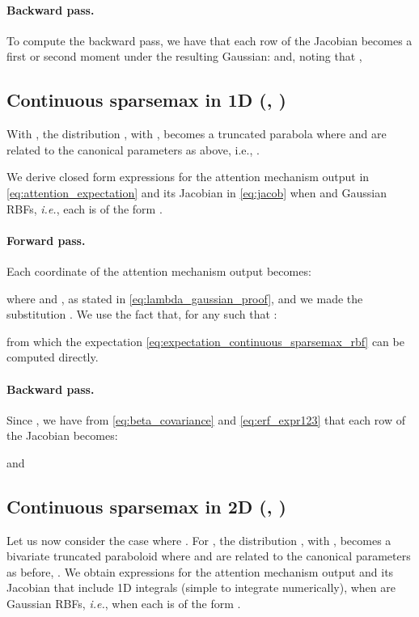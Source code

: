 \documentclass{article}
\begin{document}
\paragraph{Backward pass.}
To compute the backward pass, we have that each row of the Jacobian  becomes a first or second moment under the resulting Gaussian:
 and, noting that ,



\subsection{Continuous sparsemax in 1D (, )}

With , the distribution , with , becomes a truncated parabola where   and   are related to the canonical parameters as above, i.e., .

We  derive closed form expressions for the attention mechanism output  in \eqref{eq:attention_expectation} and its Jacobian  in \eqref{eq:jacob} when  and Gaussian RBFs, {\it i.e.}, each  is of the form .

\paragraph{Forward pass.}
Each coordinate of the attention mechanism output becomes:

where  and , as stated in \eqref{eq:lambda_gaussian_proof}, and we made the substitution
. 
We use the fact that, for any  such that :

from which the expectation \eqref{eq:expectation_continuous_sparsemax_rbf} can be computed directly.

\paragraph{Backward pass.}
Since , we have from \eqref{eq:beta_covariance} and \eqref{eq:erf_expr123} that each row of the Jacobian  becomes:

and




\subsection{Continuous sparsemax in 2D (, )}

Let us now consider the case where . 
For , the distribution , with , becomes a bivariate truncated paraboloid where  and   are related to the canonical parameters as before, . We obtain expressions for the attention mechanism output  and its Jacobian  that include 1D integrals (simple to integrate numerically), when  are Gaussian RBFs, {\it i.e.}, when each  is of the form .
\end{document}
